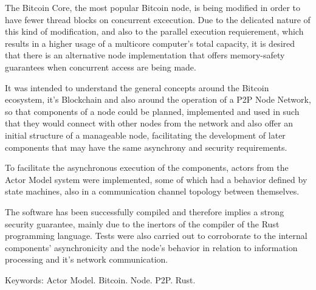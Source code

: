 \begin{resumo}[Abstract]
The Bitcoin Core, the most popular Bitcoin node, is being modified in order to have fewer thread blocks on concurrent excecution. Due to the delicated nature of this kind of modification, and also to the parallel execution requierement, which results in a higher usage of a multicore computer's total capacity, it is desired that there is an alternative node implementation that offers memory-safety guarantees when concurrent access are being made.

It was intended to understand the general concepts around the Bitcoin ecosystem, it's Blockchain and also around the operation of a P2P Node Network, so that components of a node could be planned, implemented and used in such that they would connect with other nodes from the network and also offer an initial structure of a manageable node, facilitating the development of later components that may have the same asynchrony and security requirements.

To facilitate the asynchronous execution of the components, actors from the Actor Model system were implemented, some of which had a behavior defined by state machines, also in a communication channel topology between themselves.

The software has been successfully compiled and therefore implies a strong security guarantee, mainly due to the inertors of the compiler of the Rust programming language. Tests were also carried out to corroborate to the internal components' asynchronicity and the node's behavior in relation to information processing and it's network communication.

Keywords: Actor Model. Bitcoin. Node. P2P. Rust.

\end{resumo}


\listoffigures*
\cleardoublepage



